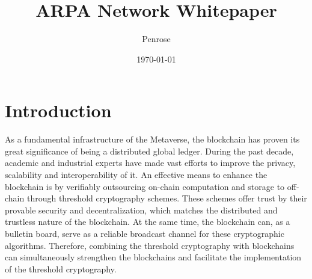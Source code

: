 \documentclass[11pt]{article}
\title{ARPA Network Whitepaper}
\author{Penrose}
\date{\today}
\begin{document}
\maketitle

\section{Introduction}

As a fundamental infrastructure of the Metaverse, the blockchain has proven its great significance of being a distributed global ledger. During the past decade, academic and industrial experts have made vast efforts to improve the privacy, scalability and interoperability of it. An effective means to enhance the blockchain is by verifiably outsourcing on-chain computation and storage to off-chain through threshold cryptography schemes. These schemes offer trust by their provable security and decentralization, which matches the distributed and trustless nature of the blockchain. At the same time, the blockchain can, as a bulletin board, serve as a reliable broadcast channel for these cryptographic algorithms. Therefore, combining the threshold cryptography with blockchains can simultaneously strengthen the blockchains and facilitate the implementation of the threshold cryptography.
\end{document}
